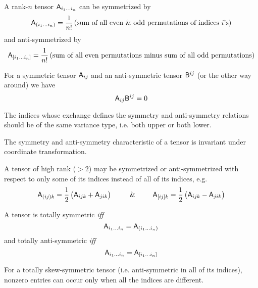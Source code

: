 A rank-$n$ tensor $\mathsf{A}_{i_{1}\ldots i_{n}}$ can be symmetrized
by
\begin{equation}
\mathsf{A}_{(i_{1}\ldots i_{n})}=\dfrac{1}{n!}\left(\text{sum of all even \& odd permutations of indices \ensuremath{i}'s}\right)
\end{equation}
and anti-symmetrized by
\begin{equation}
\mathsf{A}_{\left[i_{1}\ldots i_{n}\right]}=\dfrac{1}{n!}\left(\text{sum of all even permutations minus sum of all odd permutations}\right)
\end{equation}


 For a symmetric tensor $\mathsf{A}_{ij}$ and an anti-symmetric
tensor $\mathsf{B}^{ij}$ (or the other way around) we have
\begin{equation}
\mathsf{A}_{ij}\mathsf{B}^{ij}=0
\end{equation}


 The indices whose exchange defines the symmetry and anti-symmetry
relations should be of the same variance type, i.e. both upper or
both lower.

 The symmetry and anti-symmetry characteristic of a tensor
is invariant under coordinate transformation.

 A tensor of high rank ($>2$) may be symmetrized or anti-symmetrized
with respect to only some of its indices instead of all of its indices,
e.g.
\begin{equation}
\mathsf{A}_{(ij)k}=\dfrac{1}{2}\left(\mathsf{A}_{ijk}+\mathsf{A}_{jik}\right)\,\,\,\,\,\,\,\,\,\,\,\,\,\,\,\&\,\,\,\,\,\,\,\,\,\,\,\,\,\,\,\mathsf{A}_{[ij]k}=\dfrac{1}{2}\left(\mathsf{A}_{ijk}-\mathsf{A}_{jik}\right)
\end{equation}


 A tensor is totally symmetric \textit{iff}
\begin{equation}
\mathsf{A}_{i_{1}\ldots i_{n}}=\mathsf{A}_{(i_{1}\ldots i_{n})}
\end{equation}
and totally anti-symmetric \textit{iff}
\begin{equation}
\mathsf{A}_{i_{1}\ldots i_{n}}=\mathsf{A}_{[i_{1}\ldots i_{n}]}
\end{equation}


 For a totally skew-symmetric tensor (i.e. anti-symmetric
in all of its indices), nonzero entries can occur only when all the
indices are different.





